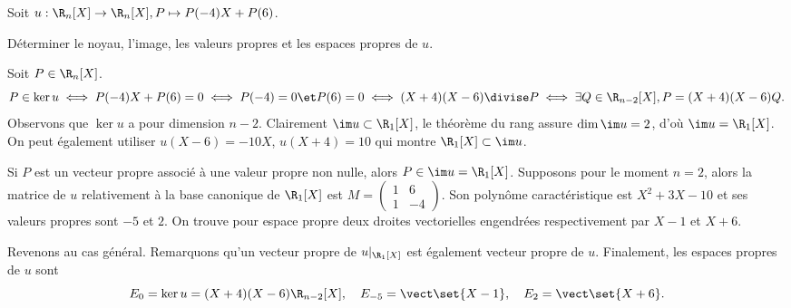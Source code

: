 \begin{enonce}
\begin{exercise}[ID={RMS121/1119 CCP PC},subtitle={},tags={mpsi}]
Soit $u:\R_n[X]\to\R_n[X], P\mapsto P(-4)X+P(6)$.

Déterminer le noyau, l'image, les valeurs propres et les espaces propres de $u$.
\end{exercise}
\begin{solution}
Soit $P\in\R_n[X]$.
\begin{equation*}
P\in\ker u
\iff P(-4)X+P(6)=0
\iff P(-4)=0 \et P(6)=0
\iff (X+4)(X-6) \divise P
\iff \exists Q\in\R_{n-2}[X], P=(X+4)(X-6)Q.
\end{equation*}
Observons que $\ker u$ a pour dimension $n-2$. Clairement $\im u\subset \R_1[X]$, le théorème du rang assure $\dim\im u=2$, d'où $\im u=\R_1[X]$. On peut également utiliser $u(X-6)=-10X$, $u(X+4)=10$ qui montre $\R_1[X]\subset\im u$.

Si $P$ est un vecteur propre associé à une valeur propre non nulle, alors $P\in\im u=\R_1[X]$. Supposons pour le moment $n=2$, alors la matrice de $u$ relativement à la base canonique de $\R_1[X]$ est
$M=\begin{pmatrix} 1& 6\\ 1&-4 \end{pmatrix}$.
Son polynôme caractéristique est $X^2+3X-10$ et ses valeurs propres sont $-5$ et $2$.
On trouve pour espace propre deux droites vectorielles engendrées respectivement par $X-1$ et $X+6$.

Revenons au cas général. 
Remarquons qu'un vecteur propre de $u|_{\R_1[X]}$ est également vecteur propre de $u$. Finalement, les espaces propres de $u$ sont
\begin{equation*}
    E_0=\ker u= (X+4)(X-6)\R_{n-2}[X],\quad
    E_{-5}=\vect\set{X-1},\quad
    E_{2}=\vect\set{X+6}.
\end{equation*}
\end{solution}
\end{enonce}
